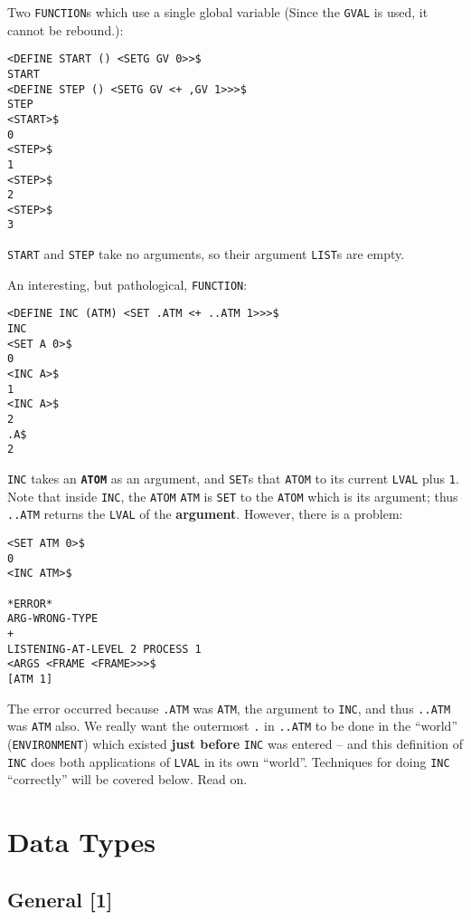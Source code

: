 \documentclass[a4paper]{scrbook}
\begin{document}
Two \texttt{FUNCTION}s which use a single global variable (Since the \texttt{GVAL} is used, it cannot
be rebound.):

\begin{verbatim}
<DEFINE START () <SETG GV 0>>$
START
<DEFINE STEP () <SETG GV <+ ,GV 1>>>$
STEP
<START>$
0
<STEP>$
1
<STEP>$
2
<STEP>$
3
\end{verbatim}

\texttt{START} and \texttt{STEP} take no arguments, so their argument \texttt{LIST}s are empty.

An interesting, but pathological, \texttt{FUNCTION}:

\begin{verbatim}
<DEFINE INC (ATM) <SET .ATM <+ ..ATM 1>>>$
INC
<SET A 0>$
0
<INC A>$
1
<INC A>$
2
.A$
2
\end{verbatim}

\texttt{INC} takes an \textbf{\texttt{ATOM}} as an argument, and \texttt{SET}s that \texttt{ATOM} to its current
\texttt{LVAL} plus \texttt{1}. Note that inside \texttt{INC}, the \texttt{ATOM} \texttt{ATM} is \texttt{SET} to the
\texttt{ATOM} which is its argument; thus \texttt{..ATM} returns the \texttt{LVAL} of the \textbf{argument}. However, there
is a problem:

\begin{verbatim}
<SET ATM 0>$
0
<INC ATM>$

*ERROR*
ARG-WRONG-TYPE
+
LISTENING-AT-LEVEL 2 PROCESS 1
<ARGS <FRAME <FRAME>>>$
[ATM 1]
\end{verbatim}

The error occurred because \texttt{.ATM} was \texttt{ATM}, the argument to \texttt{INC}, and thus \texttt{..ATM} was
\texttt{ATM} also. We really want the outermost \texttt{.} in \texttt{..ATM} to be done in the ``world''
(\texttt{ENVIRONMENT}) which existed \textbf{just before} \texttt{INC} was entered -- and this definition of \texttt{INC}
does both applications of \texttt{LVAL} in its own ``world''. Techniques for doing \texttt{INC} ``correctly'' will be
covered below. Read on.

\chapter{Data Types}\label{chapter-6.-data-types}

\section{General {[}1{]}}\label{general-1-3}
\end{document}
